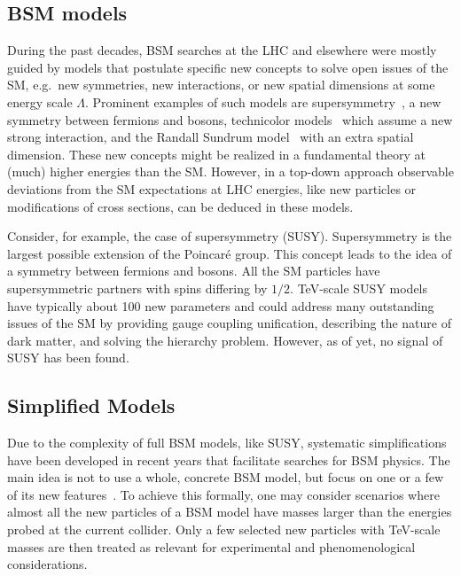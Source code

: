 \subsection{BSM models}

During the past decades, BSM searches at the LHC and elsewhere
were mostly guided by models that postulate specific new concepts to solve open issues of the SM, e.g.\
new symmetries, new interactions, or new spatial dimensions at some energy scale $\Lambda $. 
Prominent examples of such models are supersymmetry~\citep{Wess:1974tw}, a new
symmetry between fermions and bosons, technicolor
models~\citep{Weinberg:1975gm,Susskind:1978ms}  which assume a new strong interaction, and
the Randall Sundrum model~\citep{Randall:1999ee} with an extra spatial dimension.  
These new concepts might be realized in a fundamental theory at (much) higher energies than the SM. However, in a top-down approach
observable deviations from the SM expectations at LHC energies, like new particles or 
modifications of cross sections, can be deduced in these models. 

Consider, for example, the case of supersymmetry (SUSY).
Supersymmetry is the largest possible extension of the Poincar\'{e}
group. This concept
leads to the idea of a symmetry between fermions and
bosons. All the SM particles have supersymmetric partners with spins
differing by $1/2$. 
TeV-scale SUSY models have typically about 100 new parameters and could address many outstanding issues of the SM by providing gauge coupling unification, describing the nature of dark matter, and solving the hierarchy problem.
However, as of yet, no signal of SUSY has been found.  


\subsection{Simplified Models}
\label{sec:SimpMod}

Due to the complexity of full BSM models, like SUSY, systematic simplifications have been developed in recent years that facilitate
searches for BSM physics. 
The main idea is not to use a whole,
concrete BSM model, but focus on one or a few of its new
features~\citep[see, e.g.,][]{alwall2009,alves2011}. To achieve this
formally, one may consider scenarios where almost all the new particles of
a BSM model have masses larger than the energies probed at the current
collider. Only a few selected new particles with TeV-scale masses are
then treated as relevant for experimental and phenomenological considerations.

